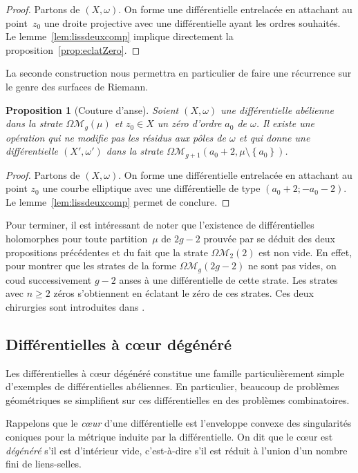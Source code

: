 \documentclass[JEP,XML,SOM,Unicode,francais,NoFloatCountersInSection,published]{cedram}
\let\mathcal\mathscr
\newcommand{\omoduli}[1][g]{{\Omega\mathcal M}_{\!#1}}
\newtheorem{prop}[thm]{Proposition}
\theoremstyle{definition}
\begin{document}
\begin{proof}
Partons de $(X,\omega)$. On forme une différentielle entrelacée en attachant au point~$z_{0}$ une droite projective avec une différentielle ayant les ordres souhaités. Le lemme~\ref{lem:lissdeuxcomp} implique directement la proposition~\ref{prop:eclatZero}.
\end{proof}

La seconde construction nous permettra en particulier de faire une récurrence sur le genre des surfaces de Riemann.

\begin{prop}[Couture d'anse]\label{prop:attachanse}
Soient $(X,\omega)$ une différentielle abélienne dans la strate $\omoduli(\mu)$ et $z_{0}\in X$ un zéro d'ordre $a_{0}$ de $\omega$.
Il existe une opération qui ne modifie pas les résidus aux pôles de $\omega$ et qui donne une différentielle $(X',\omega')$ dans la strate $\omoduli[g+1](a_{0}+2,\mu\setminus\left\{a_{0}\right\})$.
\end{prop}
\begin{proof}
Partons de $(X,\omega)$. On forme une différentielle entrelacée en attachant au point $z_{0}$ une courbe elliptique avec une différentielle de type $(a_{0}+2;-a_{0}-2)$. Le lemme~\ref{lem:lissdeuxcomp} permet de conclure.
\end{proof}

Pour terminer, il est intéressant de noter que l'existence de différentielles holomorphes pour toute partition~$\mu$ de $2g-2$ prouvée par \cite{masm} se déduit des deux propositions précédentes et du fait que la strate $\omoduli[2](2)$ est non vide. En effet, pour montrer que les strates de la forme $\omoduli(2g-2)$ ne sont pas vides, on coud successivement $g-2$ anses à une différentielle de cette strate. Les strates avec $n\geq2$ zéros s’obtiennent en éclatant le zéro de ces strates. Ces deux chirurgies sont introduites dans \cite[\S4.2]{kozo}.

\subsection{Différentielles à cœur dégénéré}
\label{sec:coeur}

Les différentielles à cœur dégénéré constitue une famille particulièrement simple d'exemples de différentielles abéliennes. En particulier, beaucoup de problèmes géométriques se simplifient sur ces différentielles en des problèmes combinatoires.

Rappelons que le \emph{cœur} d'une différentielle est l'enveloppe convexe des singularités coniques pour la métrique induite par la différentielle. On dit que le cœur est \textit{dégénéré} s'il est d'intérieur vide, c'est-à-dire s'il est réduit à l'union d'un nombre fini de liens-selles.
\end{document}
